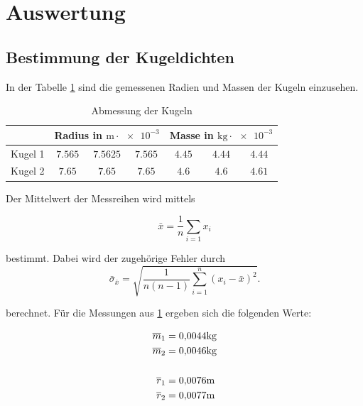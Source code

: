 \section{Auswertung}


\subsection{Bestimmung der Kugeldichten}

In der Tabelle \ref{tab:messwerte_kugel} sind die gemessenen
Radien und Massen der Kugeln einzusehen.

\begin{table}
\centering
\begin{tabular} {ccccccc}
	\toprule
  & \multicolumn{3}{c}{Radius in $\si{\meter}\cdot \num{e-3}$}  & \multicolumn{3}{c}{Masse in $\si{\kilogram}\cdot \num{e-3}$} \\
\midrule 
Kugel 1 & $\num{7.565} $&  $\num{7.5625} $ & $\num{7.565} $  & $\num{4.45}$ & $\num{4.44} $ & $\num{4.44} $ \\
Kugel 2  & $\num{7.65} $&  $\num{7.65} $ & $\num{7.65} $ & $\num{4.6}$ & $\num{4.6} $ & $\num{4.61} $ \\
\bottomrule
\end{tabular}
\caption{Abmessung der Kugeln}
\label{tab:messwerte_kugel}
\end{table}

Der Mittelwert der Messreihen wird mittels

\begin{equation}
\label{eq:mittel}
\bar{x}=\frac{1}{n}\sum_{i=1}x_i
\end{equation}

bestimmt. Dabei wird der zugehörige Fehler
durch
\begin{equation}
\label{eq:stand_ab}
\bar{\sigma}_{\bar{x}}=\sqrt{\frac{1}{n(n-1)}\sum_{i=1}^{n}(x_i-\bar{x})^2}.
\end{equation}

berechnet.
Für die Messungen aus \ref{tab:messwerte_kugel} ergeben sich die
folgenden Werte:

\begin{align}
\label{eq:abmessungen_kugel}
\begin{aligned}
\overline{m}_{1}&=  \num{0.0044}\si{\kilogram} \\
\overline{m}_{2}&= \num{0.0046} \si{\kilogram} \\
\hfill \\
\overline{r}_{1}&= \num{0.0076}\si{\meter} \\
\overline{r}_{2}&= \num{0.0077} \si{\meter} \\
\end{aligned}
\end{align}

